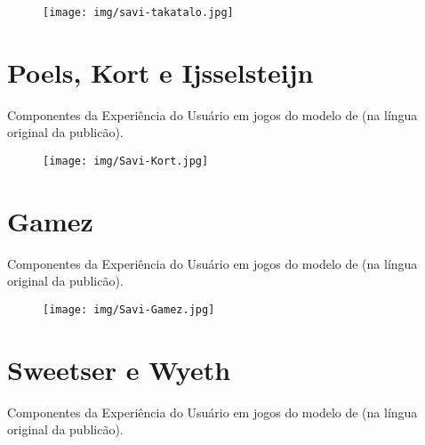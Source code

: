 \begin{figure}[h]
	\centering
	\texttt{[image: img/savi-takatalo.jpg]}
	\label{fig:anexo5}\\
\end{figure}

\newpage

\chapter{Poels, Kort e Ijsselsteijn}
\label{chap:A6}
Componentes da Experiência do Usuário em jogos do modelo de  (na língua original da publicão).

\begin{figure}[h]
	\centering
	\texttt{[image: img/Savi-Kort.jpg]}
	\label{fig:anexo6}\\
\end{figure}

\newpage

\chapter{Gamez}
\label{chap:A7}
Componentes da Experiência do Usuário em jogos do modelo de  (na língua original da publicão).

\begin{figure}[h]
	\centering
	\texttt{[image: img/Savi-Gamez.jpg]}
	\label{fig:anexo7}\\
\end{figure}

\newpage

\chapter{Sweetser e Wyeth}
\label{chap:A8}
Componentes da Experiência do Usuário em jogos do modelo de  (na língua original da publicão).

